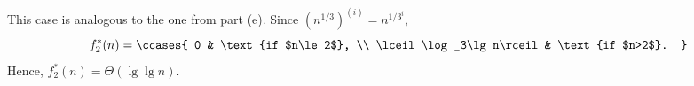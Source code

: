 This case is analogous to the one from part (e).
Since $(n^{1/3})^{(i)}=n^{1/3^i}$,
\[
    f_2^*(n) =
    \ccases{
        0 & \text{if $n\le2$}, \\
        \lceil\log_3\lg n\rceil & \text{if $n>2$}.
    }
\]
Hence, $f_2^*(n)=\Theta(\lg\lg n)$.

